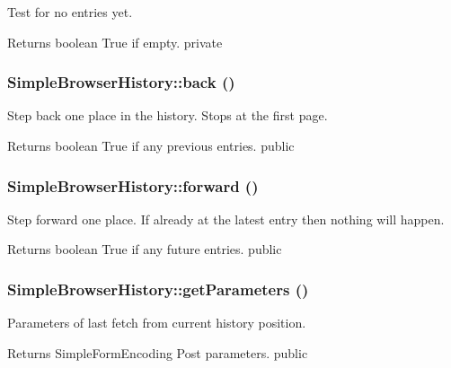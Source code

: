 \label{class_simple_browser_history_a563ca44364f4def86a41eb683ecd2cee}
Test for no entries yet. \begin{DoxyReturn}{Returns}
boolean True if empty.  private 
\end{DoxyReturn}
\hypertarget{class_simple_browser_history_a7117827a2f383f6ab09abe03514de49b}{
\subsubsection[{back}]{\setlength{\rightskip}{0pt plus 5cm}SimpleBrowserHistory::back ()}}
\label{class_simple_browser_history_a7117827a2f383f6ab09abe03514de49b}
Step back one place in the history. Stops at the first page. \begin{DoxyReturn}{Returns}
boolean True if any previous entries.  public 
\end{DoxyReturn}
\hypertarget{class_simple_browser_history_ad6015f6f26f06f236c60299e5df9aec7}{
\subsubsection[{forward}]{\setlength{\rightskip}{0pt plus 5cm}SimpleBrowserHistory::forward ()}}
\label{class_simple_browser_history_ad6015f6f26f06f236c60299e5df9aec7}
Step forward one place. If already at the latest entry then nothing will happen. \begin{DoxyReturn}{Returns}
boolean True if any future entries.  public 
\end{DoxyReturn}
\hypertarget{class_simple_browser_history_a2f597f5be027a5a2f1d389dfae75a202}{
\subsubsection[{getParameters}]{\setlength{\rightskip}{0pt plus 5cm}SimpleBrowserHistory::getParameters ()}}
\label{class_simple_browser_history_a2f597f5be027a5a2f1d389dfae75a202}
Parameters of last fetch from current history position. \begin{DoxyReturn}{Returns}
SimpleFormEncoding Post parameters.  public 
\end{DoxyReturn}
